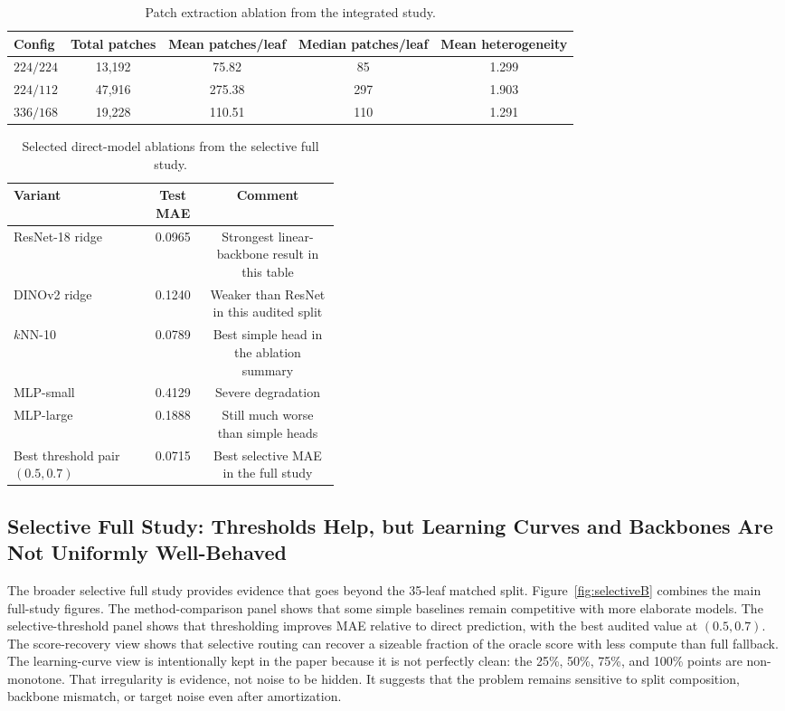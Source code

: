 \documentclass[11pt,a4paper]{article}
\begin{document}
\begin{table}[H]
\centering
\caption{Patch extraction ablation from the integrated study.}
\label{tab:patchB}
\small
\begin{tabular}{lcccc}
\toprule
Config & Total patches & Mean patches/leaf & Median patches/leaf & Mean heterogeneity \\
\midrule
$224/224$ & 13{,}192 & 75.82 & 85 & 1.299 \\
$224/112$ & 47{,}916 & 275.38 & 297 & 1.903 \\
$336/168$ & 19{,}228 & 110.51 & 110 & 1.291 \\
\bottomrule
\end{tabular}
\end{table}

\begin{table}[H]
\centering
\caption{Selected direct-model ablations from the selective full study.}
\label{tab:ablationB}
\small
\begin{tabular}{p{0.42\linewidth}cc}
\toprule
Variant & Test MAE & Comment \\
\midrule
ResNet-18 ridge & 0.0965 & Strongest linear-backbone result in this table \\
DINOv2 ridge & 0.1240 & Weaker than ResNet in this audited split \\
$k$NN-10 & 0.0789 & Best simple head in the ablation summary \\
MLP-small & 0.4129 & Severe degradation \\
MLP-large & 0.1888 & Still much worse than simple heads \\
Best threshold pair $(0.5,0.7)$ & 0.0715 & Best selective MAE in the full study \\
\bottomrule
\end{tabular}
\end{table}

\subsection{Selective Full Study: Thresholds Help, but Learning Curves and Backbones Are Not Uniformly Well-Behaved}
The broader selective full study provides evidence that goes beyond the 35-leaf matched split.
Figure~\ref{fig:selectiveB} combines the main full-study figures.
The method-comparison panel shows that some simple baselines remain competitive with more elaborate models.
The selective-threshold panel shows that thresholding improves MAE relative to direct prediction, with the best audited value at $(0.5,0.7)$.
The score-recovery view shows that selective routing can recover a sizeable fraction of the oracle score with less compute than full fallback.
The learning-curve view is intentionally kept in the paper because it is not perfectly clean: the 25\%, 50\%, 75\%, and 100\% points are non-monotone.
That irregularity is evidence, not noise to be hidden.
It suggests that the problem remains sensitive to split composition, backbone mismatch, or target noise even after amortization.
\end{document}
